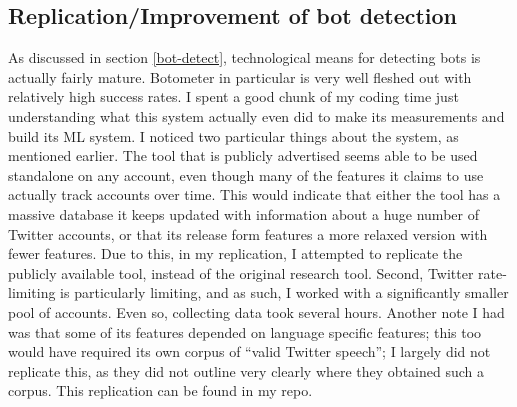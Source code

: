 \documentclass[11pt]{article}
\begin{document}
\subsection{Replication/Improvement of bot detection}
As discussed in section \ref{bot-detect}, technological means for detecting bots is actually fairly mature. Botometer \cite{botometer-main} in particular is very well fleshed out with relatively high success rates. I spent a good chunk of my coding time just understanding what this system actually even did to make its measurements and build its ML system. I noticed two particular things about the system, as mentioned earlier. The tool that is publicly advertised seems able to be used standalone on any account, even though many of the features it claims to use actually track accounts over time. This would indicate that either the tool has a massive database it keeps updated with information about a huge number of Twitter accounts, or that its release form features a more relaxed version with fewer features. Due to this, in my replication, I attempted to replicate the publicly available tool, instead of the original research tool. Second, Twitter rate-limiting is particularly limiting, and as such, I worked with a significantly smaller pool of accounts. Even so, collecting data took several hours. Another note I had was that some of its features depended on language specific features; this too would have required its own corpus of ``valid Twitter speech''; I largely did not replicate this, as they did not outline very clearly where they obtained such a corpus. This replication can be found in my repo.
\end{document}
